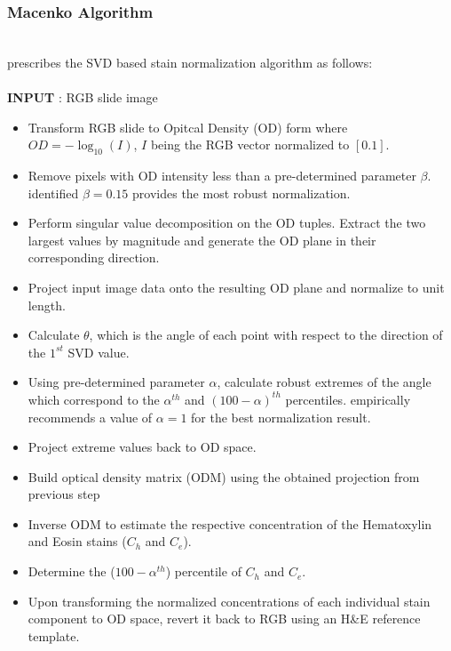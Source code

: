 \documentclass{l4proj}
\begin{document}
\subsubsection{Macenko Algorithm} \label{macenko-alg}
\hfill\\
\cite{macenko2009method} prescribes the SVD based stain normalization algorithm as follows:\\
\\
\textbf{INPUT} : RGB slide image
\begin{itemize}
    \item Transform RGB slide to Opitcal Density (OD) form where \(OD = -\log_{10}(I)\), \(I\) being the RGB vector normalized to \([0.1]\).
    \item Remove pixels with OD intensity less than a pre-determined parameter \(\beta\). \cite{macenko2009method} identified \(\beta = 0.15\) provides the most robust normalization.
    \item Perform singular value decomposition on the OD tuples. Extract the two largest values by magnitude and generate the OD plane in their corresponding direction.
    \item Project input image data onto the resulting OD plane and normalize to unit length.
    \item Calculate \(\theta\), which is the angle of each point with respect to the direction of the \(1^{st}\) SVD value.
    \item Using pre-determined parameter \(\alpha\), calculate robust extremes of the angle which correspond to the \(\alpha^{th}\) and \((100 - \alpha)^{th}\) percentiles. \cite{macenko2009method} empirically recommends a value of \(\alpha = 1\) for the best normalization result. 
    \item Project extreme values back to OD space.
    \item Build optical density matrix (ODM) using the obtained projection from previous step
    \item Inverse ODM to estimate the respective concentration of the Hematoxylin and Eosin stains (\(C_h\) and \(C_e\)). 
    \item Determine the (\(100 - \alpha^{th}\)) percentile of \(C_h\) and \(C_e\).
    \item Upon transforming the normalized concentrations of each individual stain component to OD space, revert it back to RGB using an H\&E reference template. 
\end{itemize}
\end{document}
